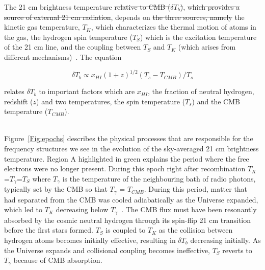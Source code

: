 	
	\attention{***} The 21 cm brightness temperature\attention{,} \st{relative to CMB (}$\delta$$T_b$\st{)}, \st{which provides a source of external 21 cm radiation}, depends on \st{the three sources, namely} the kinetic gas temperature, $T_K$, which characterizes the thermal motion of atoms in the gas, the hydrogen spin temperature ($T_S$) which is the excitation temperature of the 21 cm line, and the coupling between $T_S$ and $T_K$ (which arises from different mechanisms)~\citep{2015aska.confE...1K,2006PhR...433..181F}.  The equation  
	
	\begin{equation}
	\delta{T_b}\propto {x_{HI}}(1+z)^{1/2}({T_s}-{T_{CMB}})/{T_s}
	\end{equation}
	
	 relates $\delta$$T_b$ to important factors which are \(x_{HI}\), the fraction of neutral hydrogen, redshift ($z$) and two temperatures, the spin temperature ($T_s$) and the CMB temperature ($T_{CMB}$).
	
	 \\
	
	Figure~\ref{Fig:epochs} describes the physical processes that are responsible for the frequency structures we see in the evolution of the sky-averaged 21 cm brightness temperature.  Region A highlighted in green explains the period where the free electrons were no longer present. During this epoch right after recombination $T_K$=$T_\gamma$=$T_S$ where $T_\gamma$ is the temperature of the neighbouring bath of radio photons, typically set by the CMB so that $T_\gamma$ = $T_{CMB}$. During this period, matter that had separated from the CMB was cooled adiabatically as the Universe expanded, which led to $T_K$ decreasing below $T_\gamma$~\citep{2006PhR...433..181F}. The CMB flux must have been resonantly absorbed by the cosmic neutral hydrogen through its spin-flip 21 cm transition before the first stars formed. $T_S$ is coupled to $T_K$ as the collision between hydrogen atoms becomes initially effective, resulting in $\delta T_b$ decreasing initially. As the Universe expands and collisional coupling becomes ineffective, $T_S$ reverts to $T_\gamma$ because of CMB absorption.
	
